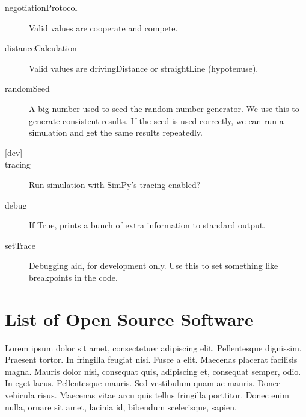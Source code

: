 \documentclass[11pt,letterpaper,onecolumn,twoside,openright,final]{report}
\begin{document}
\begin{description}
\item[negotiationProtocol]Valid values are cooperate and compete.

\item[distanceCalculation]
Valid values are drivingDistance or straightLine (hypotenuse).

\item[randomSeed]A big number used to seed the random number generator.
We use this to generate consistent results.
If the seed is used correctly, we can run a simulation and get the same results repeatedly.

\vspace{0.5cm}
\item[{[dev]}]

\item[tracing]Run simulation with SimPy's tracing enabled?

\item[debug]If True, prints a bunch of extra information to standard output.

\item[setTrace]Debugging aid, for development only.
Use this to set something like breakpoints in the code.

\end{description}


\chapter{List of Open Source Software}
Lorem ipsum dolor sit amet, consectetuer adipiscing elit. Pellentesque dignissim.
Praesent tortor.
In fringilla feugiat nisi.
Fusce a elit.
Maecenas placerat facilisis magna.
Mauris dolor nisi, consequat quis, adipiscing et, consequat semper, odio.
In eget lacus.
Pellentesque mauris.
Sed vestibulum quam ac mauris.
Donec vehicula risus.
Maecenas vitae arcu quis tellus fringilla porttitor.
Donec enim nulla, ornare sit amet, lacinia id, bibendum scelerisque, sapien.
\end{document}
